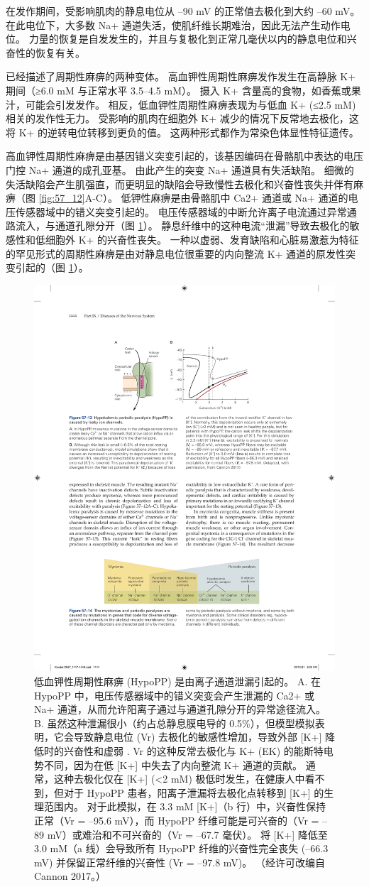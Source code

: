 在发作期间，受影响肌肉的静息电位从 –90 mV 的正常值去极化到大约 –60 mV。 在此电位下，大多数 Na+ 通道失活，使肌纤维长期难治，因此无法产生动作电位。 力量的恢复是自发发生的，并且与复极化到正常几毫伏以内的静息电位和兴奋性的恢复有关。

已经描述了周期性麻痹的两种变体。 高血钾性周期性麻痹发作发生在高静脉 K+ 期间（≥6.0 mM 与正常水平 3.5–4.5 mM）。 摄入 K+ 含量高的食物，如香蕉或果汁，可能会引发发作。 相反，低血钾性周期性麻痹表现为与低血 K+ (≤2.5 mM) 相关的发作性无力。 受影响的肌肉在细胞外 K+ 减少的情况下反常地去极化，这将 K+ 的逆转电位转移到更负的值。 这两种形式都作为常染色体显性特征遗传。

高血钾性周期性麻痹是由基因错义突变引起的，该基因编码在骨骼肌中表达的电压门控 Na+ 通道的成孔亚基。 由此产生的突变 Na+ 通道具有失活缺陷。 细微的失活缺陷会产生肌强直，而更明显的缺陷会导致慢性去极化和兴奋性丧失并伴有麻痹（图 \ref{fig:57_12}A-C）。 低钾性麻痹是由骨骼肌中 Ca2+ 通道或 Na+ 通道的电压传感器域中的错义突变引起的。 电压传感器域的中断允许离子电流通过异常通路流入，与通道孔隙分开（图 \ref{fig:57_13}）。 静息纤维中的这种电流“泄漏”导致去极化的敏感性和低细胞外 K+ 的兴奋性丧失。 一种以虚弱、发育缺陷和心脏易激惹为特征的罕见形式的周期性麻痹是由对静息电位很重要的内向整流 K+ 通道的原发性突变引起的（图 \ref{fig:57_13}）。

\begin{figure}[htbp]
	\centering
	\includegraphics[width=0.6\linewidth]{chap57/fig_57_13}
	\caption{低血钾性周期性麻痹 (HypoPP) 是由离子通道泄漏引起的。 A. 在 HypoPP 中，电压传感器域中的错义突变会产生泄漏的 Ca2+ 或 Na+ 通道，从而允许阳离子通过与通道孔隙分开的异常途径流入。 B. 虽然这种泄漏很小（约占总静息膜电导的 0.5\%），但模型模拟表明，它会导致静息电位 (Vr) 去极化的敏感性增加，导致外部 [K+] 降低时的兴奋性和虚弱 . Vr 的这种反常去极化与 K+ (EK) 的能斯特电势不同，因为在低 [K+] 中失去了内向整流 K+ 通道的贡献。 通常，这种去极化仅在 [K+] (<2 mM) 极低时发生，在健康人中看不到，但对于 HypoPP 患者，阳离子泄漏将去极化点转移到 [K+] 的生理范围内。 对于此模拟，在 3.3 mM [K+]（b 行）中，兴奋性保持正常（Vr = –95.6 mV），而 HypoPP 纤维可能是可兴奋的（Vr = –89 mV）或难治和不可兴奋的（Vr = –67.7 毫伏）。 将 [K+] 降低至 3.0 mM（a 线）会导致所有 HypoPP 纤维的兴奋性完全丧失 (–66.3 mV) 并保留正常纤维的兴奋性 (Vr = –97.8 mV)。 （经许可改编自 Cannon 2017。）}
	\label{fig:57_13}
\end{figure}

